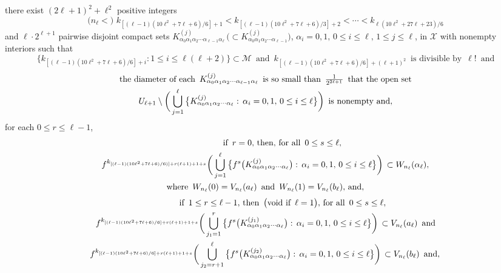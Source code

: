 \documentclass[12pt]{article}
\newcommand{\al}{\alpha}
\begin{document}
\noindent
there exist $(2\ell+1)^2+\ell^2$ positive integers 
$$
\big(n_{\ell} <\big) \,\, k_{[(\ell-1)(10\ell^2+7\ell+6)/6]+1} < k_{[(\ell-1)(10\ell^2+7\ell+6)/3]+2} < \cdots < k_{\ell(10\ell^2+27\ell+23)/6}
$$
and $\ell \cdot 2^{\ell+1}$ pairwise disjoint compact sets $K_{\al_0\al_1\al_2\cdots \al_{\ell-1}\al_\ell}^{(j)} \, \big(\subset K_{\al_0\al_1\al_2\cdots \al_{\ell-1}}^{(j)}\big)$, $\al_i = 0, 1, \, 0 \le i \le \ell, \, 1 \le j \le \ell$, in $\mathcal X$ with nonempty interiors such that
$$
\{ k_{[(\ell-1)(10\ell^2+7\ell+6)/6]+i}: 1 \le i \le \ell(\ell+2) \} \subset \mathcal M \,\,\, \text{and} \,\,\, k_{[(\ell-1)(10\ell^2+7\ell+6)/6]+(\ell+1)^2} \,\,\, \text{is divisible by} \,\,\, {\ell}! \,\,\, \text{and}
$$ 
{\large 
\begin{multline*}
$$
\text{the diameter of each} \,\,\, K_{\al_0\al_1\al_2\cdots \al_{\ell-1}\al_\ell}^{(j)} \,\,\, \text{is so small than} \,\,\, \frac 1{2^{2\ell+1}} \,\,\, \text{that the open set} \\ 
U_{\ell+1} \setminus \bigg( \bigcup_{j=1}^\ell \big\{ K_{\al_0\al_1\al_2\cdots\al_{\ell}}^{(j)}: \, \al_i = 0, 1, \, 0 \le i \le \ell \big\} \bigg) \,\,\, \text{is nonempty and},
$$
\end{multline*}}
for each $0 \le r \le \ell-1$, 
\begin{multline*}
$$
\qquad\qquad \text{if} \,\,\, r = 0, \, \text{then}, \, \text{for all} \,\,\, 0 \le s \le \ell, \\
f^{k_{[(\ell-1)(10\ell^2+7\ell+6)/6)]+r(\ell+1)+1+s}}\bigg(\bigcup_{j=1}^\ell \big\{ f^s\big(K_{\al_0\al_1\al_2\cdots\al_\ell}^{(j)}\big): \, \al_i = 0, 1, \, 0 \le i \le \ell \big\}\bigg) \, \subset W_{n_\ell}(\al_\ell), \\ 
\text{where} \,\,\, W_{n_\ell}(0) = V_{n_\ell}(a_\ell) \,\,\, \text{and} \,\,\, W_{n_\ell}(1) = V_{n_\ell}(b_\ell), \, \text{and},
$$
\end{multline*}
\begin{multline*}
$$
\qquad\qquad \text{if} \,\,\, 1 \le r \le \ell-1, \, \text{then} \,\,\, \big(\text{void if} \,\,\, \ell = 1\big), \, \text{for all} \,\,\, 0 \le s \le \ell, \\
f^{k_{[(\ell-1)(10\ell^2+7\ell+6)/6]+r(\ell+1)+1+s}}\bigg(\bigcup_{j_1=1}^r \big\{ f^s\big(K_{\al_0\al_1\al_2\cdots\al_\ell}^{(j_1)}\big): \, \al_i = 0, 1, \, 0 \le i \le \ell \big\}\bigg) \, \subset V_{n_\ell}(a_\ell) \,\,\, \text{and} \\ 
f^{k_{[(\ell-1)(10\ell^2+7\ell+6)/6]+r(\ell+1)+1+s}}\bigg(\bigcup_{j_2=r+1}^\ell \big\{ f^s\big(K_{\al_0\al_1\al_2\cdots\al_\ell}^{(j_2)}\big): \, \al_i = 0, 1, \, 0 \le i \le \ell \big\}\bigg) \, \subset V_{n_\ell}(b_\ell) \,\,\,\text{and},\,
$$
\end{multline*}
\end{document}
